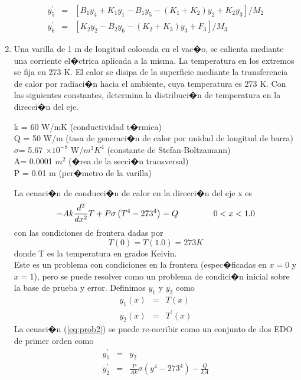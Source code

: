 \documentclass[11pt]{article}
\begin{document}
\begin{enumerate}
\begin{eqnarray}
y^{'}_{5} & = & \left[ B_{1}y_{4} + K_{1}y_{1} - B_{1}y_{5} - \left( K_{1}+K_{2} \right) y_{2} + K_{2}y_{3} \right] / M_{2}\\
y^{'}_{6} & = & \left[ K_{2}y_{2} - B_{2}y_{6} - \left( K_{2}+ K_{3} \right)y_{3} + F_{3} \right] / M_{3}
\end{eqnarray}
\item Una varilla de 1 m de longitud colocada en el vac�o, se calienta mediante una corriente el�ctrica aplicada a la misma. La temperatura en los extremos se fija en 273 K. El calor se disipa de la superficie mediante la transferencia de calor por radiaci�n hacia el ambiente, cuya temperatura es 273 K. Con las siguientes constantes, determina la distribuci�n de temperatura en la direcci�n del eje.
\begin{tabbing}
k = 60 W/mK \hspace{2.5cm} \= (conductividad t�rmica) \\
Q = 50 W/m \> (tasa de generaci�n de calor por unidad de longitud de barra) \\
$\sigma$= 5.67 $\times 10^{-8}$ W/$m^{2}K^{4}$ \> (constante de Stefan-Boltzamann) \\
A= 0.0001 $m^{2}$ \> (�rea de la secci�n transversal) \\
P = 0.01 m \> (per�metro de la varilla)
\end{tabbing}
La ecuaci�n de conducci�n de calor en la direcci�n del eje x es
\begin{equation} \label{eq:prob2}
-Ak \frac{d^{2}}{dx^{2}} T + P \sigma \left( T^{4} - 273^{4} \right) = Q \hspace{1.5cm} 0 < x < 1.0 
\end{equation}
con las condiciones de frontera dadas por
\[ T(0) = T(1.0) = 273 K \]
donde T es la temperatura en grados Kelvin.
\\ Este es un problema con condiciones en la frontera (espec�ficadas en $x=0$ y $x=1$), pero se puede resolver como un problema de condici�n inicial sobre la base de prueba y error. Definimos $y_{1}$ y $y_{2}$ como
\begin{eqnarray}
y_{1}(x) & = & T(x)\\
y_{2}(x) & = & T^{'}(x)
\end{eqnarray}
La ecuaci�n (\ref{eq:prob2}) se puede re-escribir como un conjunto de dos EDO de primer orden como
\begin{eqnarray}
y^{'}_{1} & = & y_{2} \\
y^{'}_{2} & = & \frac{P}{Ak} \sigma (y^{4} - 273^{4}) - \frac{Q}{kA}
\end{eqnarray}

\end{enumerate}
\end{document}
